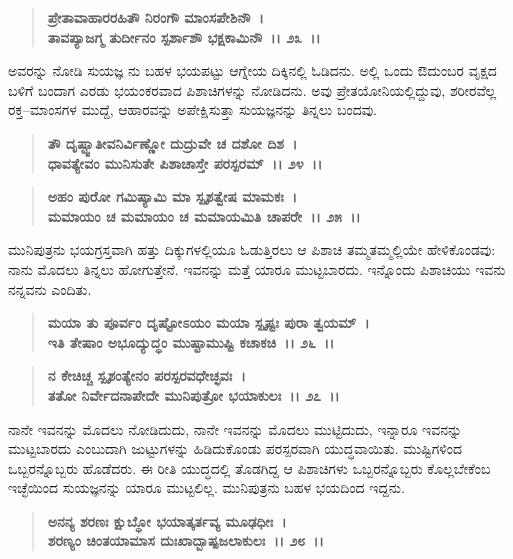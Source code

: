 \begin{verse}
\textbf{ಪ್ರೇತಾವಾಹಾರರಹಿತೌ ನಿರಂಗೌ ಮಾಂಸಪೇಶಿನೌ~।}\\\textbf{ತಾವಪ್ಯಾಜಗ್ಮ ತುರ್ದೀನಂ ಸ್ಪರ್ಶಾಶೌ ಭಕ್ಷಕಾಮಿನೌ~।। ೨೩~।।}
\end{verse}

ಅವರನ್ನು ನೋಡಿ ಸುಯಜ್ಞ ನು ಬಹಳ ಭಯಪಟ್ಟು ಆಗ್ನೇಯ ದಿಕ್ಕಿನಲ್ಲಿ ಓಡಿದನು. ಅಲ್ಲಿ ಒಂದು ಔದುಂಬರ ವೃಕ್ಷದ ಬಳಿಗೆ ಬಂದಾಗ ಎರಡು ಭಯಂಕರವಾದ ಪಿಶಾಚಿಗಳನ್ನು ನೋಡಿದನು. ಅವು ಪ್ರೇತಯೋನಿಯಲ್ಲಿದ್ದುವು, ಶರೀರವೆಲ್ಲ ರಕ್ತ–ಮಾಂಸಗಳ ಮುದ್ದೆ, ಆಹಾರವನ್ನು ಅಪೇಕ್ಷಿಸುತ್ತಾ ಸುಯಜ್ಞನನ್ನು ತಿನ್ನಲು ಬಂದವು.

\begin{verse}
\textbf{ತೌ ದೃಷ್ಟ್ವಾತೀವನಿರ್ವಿಣ್ಣೋ ದುದ್ರುವೇ ಚ ದಶೋ ದಿಶ~।}\\\textbf{ಧಾವತ್ಯೇವಂ ಮುನಿಸುತೇ ಪಿಶಾಚಾಸ್ತೇ ಪರಸ್ಪರಮ್~।। ೨೪~।। }
\end{verse}

\begin{verse}
\textbf{ಅಹಂ ಪುರೋ ಗಮಿಷ್ಯಾಮಿ ಮಾ ಸ್ಪೃಶತ್ವೇಷ ಮಾಮಕಃ~।}\\\textbf{ಮಮಾಯಂ ಚ ಮಮಾಯಂ ಚ ಮಮಾಯಮಿತಿ ಚಾಪರೇ~।। ೨೫~।।}
\end{verse}

ಮುನಿಪುತ್ರನು ಭಯಗ್ರಸ್ತವಾಗಿ ಹತ್ತು ದಿಕ್ಕುಗಳಲ್ಲಿಯೂ ಓಡುತ್ತಿರಲು ಆ ಪಿಶಾಚಿ ತಮ್ಮತಮ್ಮಲ್ಲಿಯೇ ಹೇಳಿಕೊಂಡವು: ನಾನು ಮೊದಲು ತಿನ್ನಲು ಹೋಗುತ್ತೇನೆ. ಇವನನ್ನು ಮತ್ತೆ ಯಾರೂ ಮುಟ್ಟಬಾರದು. ಇನ್ನೊಂದು ಪಿಶಾಚಿಯು ಇವನು ನನ್ನವನು ಎಂದಿತು.

\begin{verse}
\textbf{ಮಯಾ ತು ಪೂರ್ವಂ ದೃಷ್ಟೋಽಯಂ ಮಯಾ ಸ್ಪೃಷ್ಟಃ ಪುರಾ ತ್ವಯಮ್~।}\\\textbf{ಇತಿ ತೇಷಾಂ ಅಭೂದ್ಯುದ್ಧಂ ಮುಷ್ಟಾಮುಷ್ಟಿ ಕಚಾಕಚಿ~।। ೨೬~।।}
\end{verse}

\begin{verse}
\textbf{ನ ಕೇಚಿಚ್ಚ ಸ್ಪೃಶಂತ್ಯೇನಂ ಪರಸ್ಪರವಧೇಚ್ಛವಃ~।}\\\textbf{ತತೋ ನಿರ್ವೇದನಾಪೇದೇ ಮುನಿಪುತ್ರೋ ಭಯಾಕುಲಃ~।। ೨೭~।।}
\end{verse}

ನಾನೇ ಇವನನ್ನು ಮೊದಲು ನೋಡಿದುದು, ನಾನೇ ಇವನನ್ನು ಮೊದಲು ಮುಟ್ಟಿದುದು, ಇನ್ನಾರೂ ಇವನನ್ನು ಮುಟ್ಟಬಾರದು ಎಂಬುದಾಗಿ ಜುಟ್ಟುಗಳನ್ನು ಹಿಡಿದುಕೊಂಡು ಪರಸ್ಪರವಾಗಿ ಯುದ್ಧವಾಯಿತು. ಮುಷ್ಟಿಗಳಿಂದ ಒಬ್ಬರನ್ನೊಬ್ಬರು ಹೊಡೆದರು. ಈ ರೀತಿ ಯುದ್ಧದಲ್ಲಿ ತೊಡಗಿದ್ದ ಆ ಪಿಶಾಚಿಗಳು ಒಬ್ಬರನ್ನೊಬ್ಬರು ಕೊಲ್ಲಬೇಕೆಂಬ ಇಚ್ಛೆಯಿಂದ ಸುಯಜ್ಞನನ್ನು ಯಾರೂ ಮುಟ್ಟಲಿಲ್ಲ. ಮುನಿಪುತ್ರನು ಬಹಳ ಭಯದಿಂದ ಇದ್ದನು.

\begin{verse}
\textbf{ಅನನ್ಯ ಶರಣಃ ಕ್ಷುಬ್ಧೋ ಭಯಾತ್ಕರ್ತವ್ಯ ಮೂಢಧೀಃ~।}\\\textbf{ಶರಣ್ಯಂ ಚಿಂತಯಾಮಾಸ ದುಃಖಾದ್ಬಾಷ್ಪಜಲಾಕುಲಃ~।। ೨೮~।।}
\end{verse}

